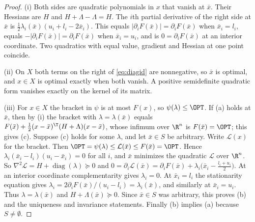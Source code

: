 \begin{proof}
(i) Both sides are quadratic polynomials in $x$ that vanish at $\bar x$.
Their Hessians are $H$ and $H+\Lambda-\Lambda=H$. The $i$th partial
derivative of the right side at $\bar x$ is
$\frac12\lambda_i(\bar x)(u_i+l_i-2\bar x_i)$. This equals
$|\partial_iF(\bar x)|=\partial_iF(\bar x)$ when $\bar x_i=l_i$, equals
$-|\partial_iF(\bar x)|=\partial_iF(\bar x)$ when $\bar x_i=u_i$, and is
$0=\partial_iF(\bar x)$ at an interior coordinate. Two quadratics with equal
value, gradient and Hessian at one point coincide.

(ii) On $X$ both terms on the right of \eqref{eq:diagid} are nonnegative,
so $\bar x$ is optimal, and $x\in X$ is optimal exactly when both vanish. A
positive semidefinite quadratic form vanishes exactly on the kernel of its
matrix.

(iii) For $x\in X$ the bracket in $\psi$ is at most $F(x)$, so
$\psi(\lambda)\le\OPT$. If (a) holds at $\bar x$, then by (i) the bracket with
$\lambda=\lambda(\bar x)$ equals $F(\bar x)+\frac12(x-\bar x)^{\T}(H+\Lambda)(x-\bar x)$,
whose infimum over $\R^n$ is $F(\bar x)=\OPT$; this gives (c). Suppose (c)
holds for some $\lambda$, and let $\bar x\in S$ be arbitrary. Write
$\mathcal L(x)$ for the bracket. Then
$\OPT=\psi(\lambda)\le\mathcal L(\bar x)\le F(\bar x)=\OPT$. Hence
$\lambda_i(\bar x_i-l_i)(u_i-\bar x_i)=0$ for all $i$, and $\bar x$ minimizes
the quadratic $\mathcal L$ over $\R^n$. So
$\nabla^2\mathcal L=H+\operatorname{diag}(\lambda)\succeq0$ and
$0=\partial_i\mathcal L(\bar x)=\partial_iF(\bar x)+\lambda_i\bigl(\bar x_i-\tfrac{l_i+u_i}2\bigr)$.
At an interior coordinate complementarity gives $\lambda_i=0$. At
$\bar x_i=l_i$ the stationarity equation gives
$\lambda_i=2\partial_iF(\bar x)/(u_i-l_i)=\lambda_i(\bar x)$, and similarly at
$\bar x_i=u_i$. Thus $\lambda=\lambda(\bar x)$ and
$H+\Lambda(\bar x)\succeq0$. Since $\bar x\in S$ was arbitrary, this proves (b)
and the uniqueness and invariance statements. Finally (b) implies (a)
because $S\ne\emptyset$.
\end{proof}


